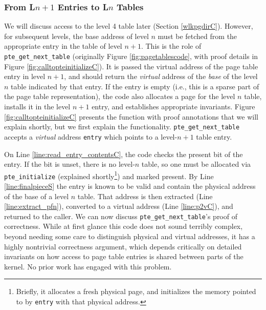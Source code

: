 \subsubsection{From L$n+1$ Entries to L$n$ Tables}
We will discuss access to the level 4 table later (Section \ref{wlkpgdirC}). However, for subsequent levels, the base address of level $n$ must be
fetched from the appropriate entry in the table of level $n+1$.
This is the role of \lstinline|pte_get_next_table| (originally Figure \ref{fig:pagetablescode}, with proof details in Figure \ref{fig:calltopteinitializeC}).
It is passed the virtual address of the page table entry in level $n+1$, and should return the \emph{virtual} 
address of the \emph{base} of the level $n$ table
indicated by that entry.
If the entry is empty (i.e., this is a sparse part of the page table representation),
the code also allocates a page for the level $n$ table, installs it in the level $n+1$ entry, and establishes appropriate invariants.
Figure \ref{fig:calltopteinitializeC} presents the function with proof annotations that we will explain shortly, but we first explain the functionality.
\lstinline|pte_get_next_table| accepts a \emph{virtual} address \lstinline|entry| which points to a level-$n+1$
table entry.

On Line \ref{line:read_entry_contentsC}, the code checks the present bit of the entry.
If the bit is unset, there is no level-$n$ table, so one must be allocated via \lstinline|pte_initialize| (explained shortly\footnote{
  Briefly, it allocates a fresh physical page, and initializes the memory pointed to by \lstinline|entry| with that physical address.
}) and marked present.
By Line \ref{line:finalpieceS} the entry is known to be valid and contain the physical address of
the base of a level $n$ table. That address is then extracted (Line \ref{line:extract_pfn}),
converted to a virtual address (Line \ref{line:p2vC}), and returned to the caller.
We can now discuss \lstinline|pte_get_next_table|'s proof of correctness.
While at first glance this code does not sound terribly complex, beyond needing some care to distinguish physical and virtual addresses,
it has a highly nontrivial correctness argument, which depends critically on detailed invariants on how access to page table
entries is shared between parts of the kernel. No prior work has engaged with this problem.

